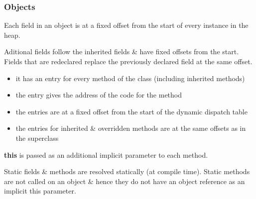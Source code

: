 \subsubsection{Objects}
Each field in an object is at a fixed offset from the start of 
every instance in the heap.

Aditional fields follow the inherited fields \& have fixed 
offsets from the start. Fields that are redeclared replace the 
previously declared field at the same offset.

\begin{itemize}
    \item it has an entry for every method of the class (including inherited 
    methods)
    \item the entry gives the address of the code for the method
    \item the entries are at a fixed offset from the start of the dynamic 
    dispatch table
    \item the entries for inherited \& overridden methods are at the same 
    offsets as in the superclass
\end{itemize}

\textbf{this} is passed as an additional implicit parameter to each method.

Static fields \& methods are resolved statically (at compile time). Static
methods are not called on an object \& hence they do not have an object 
reference as an implicit this parameter.